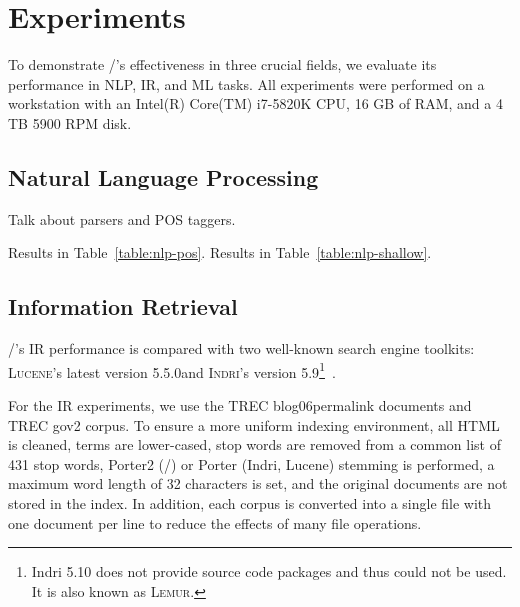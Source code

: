 \section{Experiments}
\label{sec:experiments}

To demonstrate \meta/'s effectiveness in three crucial fields, we evaluate its
performance in NLP, IR, and ML tasks. All experiments were performed on a
workstation with an Intel(R) Core(TM) i7-5820K CPU, 16 GB of RAM, and a 4
TB 5900 RPM disk.

\subsection{Natural Language Processing}

Talk about parsers and POS taggers.

Results in Table~\ref{table:nlp-pos}.
Results in Table~\ref{table:nlp-shallow}.





\subsection{Information Retrieval}

\meta/'s IR performance is compared with two well-known search engine toolkits:
\textsc{Lucene}'s latest version 5.5.0\footnotemark[12] and
\textsc{Indri}'s version 5.9\footnote{Indri 5.10 does not provide source
    code packages and thus could not be used. It is also known as
\textsc{Lemur}.}~\cite{lemur}.


For the IR experiments, we use the TREC blog06\footnotemark[7] permalink
documents and TREC gov2 corpus\footnotemark[8].
To ensure a more uniform indexing environment, all HTML is cleaned, terms are
lower-cased, stop words are removed from a common list of 431 stop words,
Porter2 (\meta/) or Porter (Indri, Lucene) stemming is performed, a maximum word
length of 32 characters is set, and the original documents are not stored in the
index. In addition, each corpus is converted into a single file with one
document per line to reduce the effects of many file operations.



